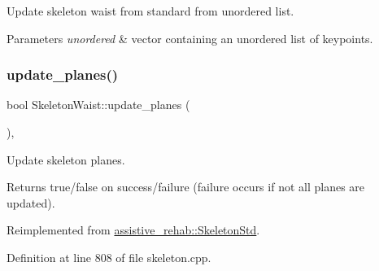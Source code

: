 Update skeleton waist from standard from unordered list. 


\begin{DoxyParams}{Parameters}
{\em unordered} & vector containing an unordered list of keypoints. \\
\hline
\end{DoxyParams}
\mbox{\label{classassistive__rehab_1_1SkeletonWaist_aee15b1accdf628b18dac2a372597644a}} 
\subsubsection{\texorpdfstring{update\_planes()}{update\_planes()}}
{\footnotesize\ttfamily bool Skeleton\+Waist\+::update\+\_\+planes (\begin{DoxyParamCaption}{ }\end{DoxyParamCaption})\hspace{0.3cm}{\ttfamily [override]}, {\ttfamily [virtual]}}



Update skeleton planes. 

\begin{DoxyReturn}{Returns}
true/false on success/failure (failure occurs if not all planes are updated). 
\end{DoxyReturn}


Reimplemented from \mbox{\hyperlink{classassistive__rehab_1_1SkeletonStd_a5769bc6fd407118c866b57b869d672ca}{assistive\+\_\+rehab\+::\+Skeleton\+Std}}.



Definition at line 808 of file skeleton.\+cpp.


